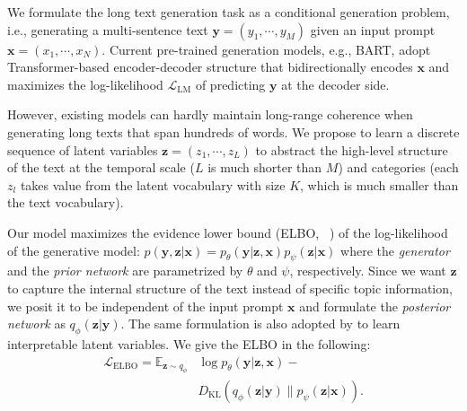\documentclass[11pt]{article}
\begin{document}
We formulate the long text generation task as a conditional generation problem, i.e., generating a multi-sentence text $\boldsymbol{y}=(y_1,\cdots,y_M)$ given an input prompt $\boldsymbol{x}=(x_1,\cdots,x_N)$. Current pre-trained generation models, e.g., BART, adopt Transformer-based encoder-decoder structure that bidirectionally encodes $\boldsymbol{x}$ and maximizes the log-likelihood $\mathcal{L}_{\text{LM}}$ of predicting $\boldsymbol{y}$ at the decoder side.

However, existing models can hardly maintain long-range coherence when generating long texts that span hundreds of words. We propose to learn a discrete sequence of latent variables $\boldsymbol{z}=(z_1,\cdots, z_L)$ to abstract the high-level structure of the text at the temporal scale ($L$ is much shorter than $M$) and categories (each $z_l$ takes value from the latent vocabulary with size $K$, which is much smaller than the text vocabulary).


Our model maximizes the evidence lower bound (ELBO, ~\citealp{DBLP:journals/corr/KingmaW13}) of the log-likelihood of
the generative model: $p(\boldsymbol{y},\boldsymbol{z}|\boldsymbol{x})=p_\theta(\boldsymbol{y}|\boldsymbol{z},\boldsymbol{x})p_\psi(\boldsymbol{z}|\boldsymbol{x})$ where the \textit{generator} and the \textit{prior network} are parametrized by $\theta$ and $\psi$, respectively. 
Since we want $\boldsymbol{z}$ to capture the internal structure of the text instead of specific topic information, we posit it to be independent of the input prompt $\boldsymbol{x}$ and formulate the \textit{posterior network} as $q_\phi(\boldsymbol{z}|\boldsymbol{y})$. The same formulation is also adopted by \citet{DBLP:conf/acl/EskenaziLZ18} to learn interpretable latent variables.
We give the ELBO in the following:
\begin{align}\label{equ:elbo}
    \mathcal{L}_{\text{ELBO}} = \mathbb{E}_{\boldsymbol{z}\sim q_\phi} & \log p_\theta(\boldsymbol{y}|\boldsymbol{z},\boldsymbol{x}) - \nonumber\\
    & D_{\text{KL}}(q_\phi(\boldsymbol{z}|\boldsymbol{y})\|p_\psi(\boldsymbol{z}|\boldsymbol{x})).
\end{align}
\end{document}
